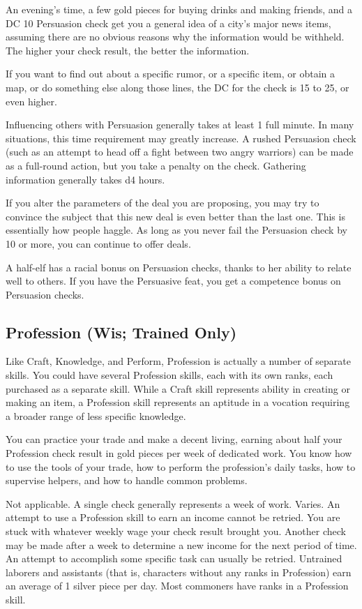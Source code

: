  An evening's time, a few gold pieces for buying drinks and making friends, and a DC 10 Persuasion check get you a general idea of a city's major news items, assuming there are no obvious reasons why the information would be withheld. The higher your check result, the better the information.

If you want to find out about a specific rumor, or a specific item, or obtain a map, or do something else along those lines, the DC for the check is 15 to 25, or even higher.

 Influencing others with Persuasion generally takes at least 1 full minute. In many situations, this time requirement may greatly increase. A rushed Persuasion check (such as an attempt to head off a fight between two angry warriors) can be made as a full-round action, but you take a  penalty on the check. Gathering information generally takes d4 hours.

 If you alter the parameters of the deal you are proposing, you may try to convince the subject that this new deal is even better than the last one. This is essentially how people haggle. As long as you never fail the Persuasion check by 10 or more, you can continue to offer deals.

 A half-elf has a  racial bonus on Persuasion checks, thanks to her ability to relate well to others.
If you have the Persuasive feat, you get a  competence bonus on Persuasion checks.

\subsection{Profession (Wis; Trained Only)}
Like Craft, Knowledge, and Perform, Profession is actually a number of separate skills. You could have several Profession skills, each with its own ranks, each purchased as a separate skill. While a Craft skill represents ability in creating or making an item, a Profession skill represents an aptitude in a vocation requiring a broader range of less specific knowledge.

 You can practice your trade and make a decent living, earning about half your Profession check result in gold pieces per week of dedicated work. You know how to use the tools of your trade, how to perform the profession's daily tasks, how to supervise helpers, and how to handle common problems.

 Not applicable. A single check generally represents a week of work.
 Varies. An attempt to use a Profession skill to earn an income cannot be retried. You are stuck with whatever weekly wage your check result brought you. Another check may be made after a week to determine a new income for the next period of time. An attempt to accomplish some specific task can usually be retried.
 Untrained laborers and assistants (that is, characters without any ranks in Profession) earn an average of 1 silver piece per day. Most commoners have ranks in a Profession skill.

